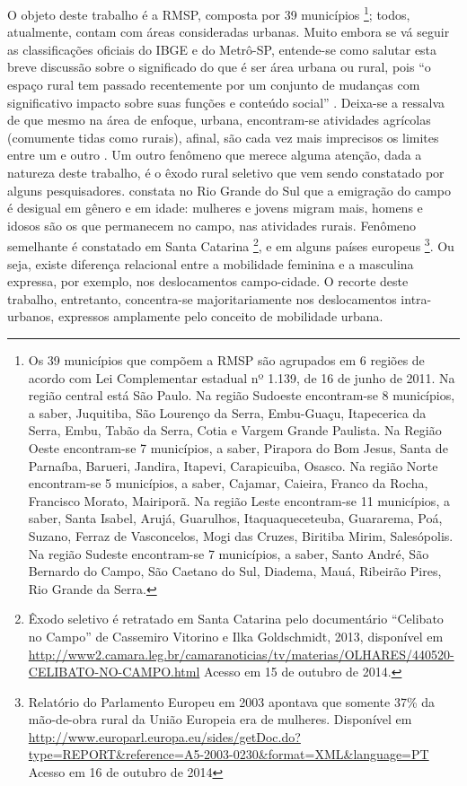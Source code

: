 O objeto deste trabalho é a RMSP, composta por 39 municípios
\footnote{Os 39 municípios que compõem a RMSP são agrupados em 6 regiões de acordo com Lei Complementar estadual nº 1.139, de 16 de junho de 2011. Na região central está São Paulo. Na região Sudoeste encontram-se 8 municípios, a saber, Juquitiba, São Lourenço da Serra, Embu-Guaçu, Itapecerica da Serra, Embu, Tabão da Serra, Cotia e Vargem Grande Paulista. Na Região Oeste encontram-se 7 municípios, a saber, Pirapora do Bom Jesus, Santa de Parnaíba, Barueri, Jandira, Itapevi, Carapicuiba, Osasco. Na região Norte encontram-se 5 municípios, a saber, Cajamar, Caieira, Franco da Rocha, Francisco Morato, Mairiporã. Na região Leste encontram-se 11 municípios, a saber, Santa Isabel, Arujá, Guarulhos, Itaquaqueceteuba, Guararema, Poá, Suzano, Ferraz de Vasconcelos, Mogi das Cruzes, Biritiba Mirim, Salesópolis. Na região Sudeste encontram-se 7 municípios, a saber, Santo André, São Bernardo do Campo, São Caetano do Sul, Diadema, Mauá, Ribeirão Pires, Rio Grande da Serra.}; todos, atualmente, contam com áreas consideradas urbanas. 
Muito embora se vá seguir as classificações oficiais do IBGE e do Metrô-SP, entende-se como salutar esta breve discussão sobre o significado do que é ser área urbana ou rural, pois ``o espaço rural tem passado recentemente por um conjunto de mudanças com significativo impacto sobre suas funções e conteúdo social'' \cite[p.96]{MARQUES2002}. Deixa-se a ressalva de que mesmo na área de enfoque, urbana, encontram-se atividades agrícolas (comumente tidas como rurais), afinal, são cada vez mais imprecisos os limites entre um e outro \cite{MINGIONE1987}. Um outro fenômeno que merece alguma atenção, dada a natureza deste trabalho, é o êxodo rural seletivo que vem sendo constatado por alguns pesquisadores. \cite{RAUBER2010} constata no Rio Grande do Sul que a emigração do campo é desigual em gênero e em idade: mulheres e jovens migram mais, homens e idosos são os que permanecem no campo, nas atividades rurais. Fenômeno semelhante é constatado em Santa Catarina
\footnote{Êxodo seletivo é retratado em Santa Catarina pelo documentário ``Celibato no Campo'' de Cassemiro Vitorino e Ilka Goldschmidt, 2013, disponível em \url{http://www2.camara.leg.br/camaranoticias/tv/materias/OLHARES/440520-CELIBATO-NO-CAMPO.html} Acesso em 15 de outubro de 2014.},
e em alguns países europeus
\footnote{Relatório do Parlamento Europeu em 2003 apontava que somente 37\% da mão-de-obra rural da União Europeia era de mulheres. Disponível em \url{http://www.europarl.europa.eu/sides/getDoc.do?type=REPORT&reference=A5-2003-0230&format=XML&language=PT} Acesso em  16 de outubro de 2014}. Ou seja, existe diferença relacional entre a mobilidade feminina e a masculina expressa, por exemplo, nos deslocamentos campo-cidade.
O recorte deste trabalho, entretanto, concentra-se majoritariamente nos deslocamentos intra-urbanos, expressos amplamente pelo conceito de mobilidade urbana. 

